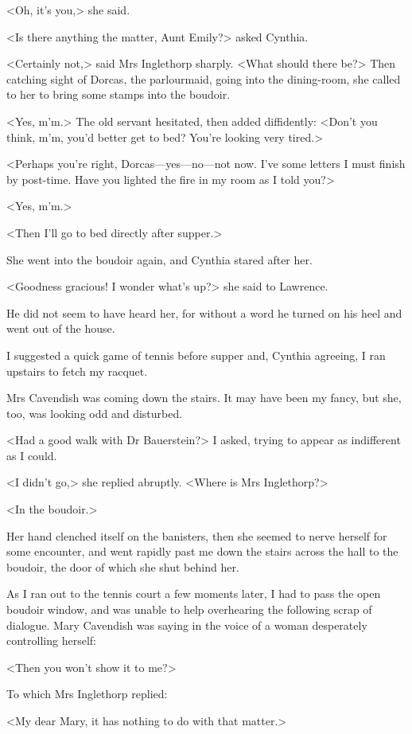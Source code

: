  <Oh, it's you,> she said. 

 <Is there anything the matter, Aunt Emily?> asked Cynthia. 

 <Certainly not,> said Mrs Inglethorp sharply. <What should there be?> Then catching sight of Dorcas, the parlourmaid, going into the dining-room, she called to her to bring some stamps into the boudoir. 

 <Yes, m'm.> The old servant hesitated, then added diffidently: <Don't you think, m'm, you'd better get to bed? You're looking very tired.> 

 <Perhaps you're right, Dorcas—yes—no—not now. I've some letters I must finish by post-time. Have you lighted the fire in my room as I told you?> 

 <Yes, m'm.> 

 <Then I'll go to bed directly after supper.> 

 She went into the boudoir again, and Cynthia stared after her. 

 <Goodness gracious! I wonder what's up?> she said to Lawrence. 

 He did not seem to have heard her, for without a word he turned on his heel and went out of the house. 

 I suggested a quick game of tennis before supper and, Cynthia agreeing, I ran upstairs to fetch my racquet. 

 Mrs Cavendish was coming down the stairs. It may have been my fancy, but she, too, was looking odd and disturbed. 

 <Had a good walk with Dr Bauerstein?> I asked, trying to appear as indifferent as I could. 

 <I didn't go,> she replied abruptly. <Where is Mrs Inglethorp?> 

 <In the boudoir.> 

 Her hand clenched itself on the banisters, then she seemed to nerve herself for some encounter, and went rapidly past me down the stairs across the hall to the boudoir, the door of which she shut behind her. 

 As I ran out to the tennis court a few moments later, I had to pass the open boudoir window, and was unable to help overhearing the following scrap of dialogue. Mary Cavendish was saying in the voice of a woman desperately controlling herself: 

 <Then you won't show it to me?> 

 To which Mrs Inglethorp replied: 

 <My dear Mary, it has nothing to do with that matter.> 

